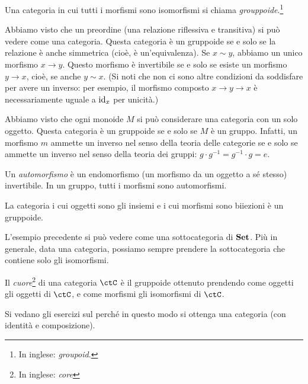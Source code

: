\begin{definition}
 Una categoria in cui tutti i morfismi sono isomorfismi si chiama \emph{grouppoide}.\footnote{In inglese: \emph{groupoid}.} 
\end{definition}

\begin{example}
 Abbiamo visto che un preordine (una relazione riflessiva e transitiva) si può vedere come una categoria. Questa categoria è un gruppoide se e solo se la relazione è anche simmetrica (cioè, è un'equivalenza). Se $x\sim y$, abbiamo un unico morfismo $x\to y$. Questo morfismo è invertibile se e solo se esiste un morfismo $y\to x$, cioè, se anche $y\sim x$. (Si noti che non ci sono altre condizioni da soddisfare per avere un inverso: per esempio, il morfismo composto $x\to y\to x$ è necessariamente uguale a $\mathrm{id}_x$ per unicità.)
\end{example}

\begin{example}
 Abbiamo visto che ogni monoide $M$ si può considerare una categoria con un solo oggetto. Questa categoria è un gruppoide se e solo se $M$ è un gruppo. Infatti, un morfismo $m$ ammette un inverso nel senso della teoria delle categorie se e solo se ammette un inverso nel senso della teoria dei gruppi: $g\cdot g^{-1}=g^{-1}\cdot g = e$. 
\end{example}

Un \emph{automorfismo} è un endomorfismo (un morfismo da un oggetto a sé stesso) invertibile. In un gruppo, tutti i morfismi sono automorfismi.

\begin{example}
 La categoria i cui oggetti sono gli insiemi e i cui morfismi sono biiezioni è un gruppoide.
\end{example}

L'esempio precedente si può vedere come una sottocategoria di $\mathbf{Set}$.
Più in generale, data una categoria, possiamo sempre prendere la sottocategoria che contiene solo gli isomorfismi.

\begin{definition} 
 Il \emph{cuore}\footnote{In inglese: \emph{core}} di una categoria $\ctC$ è il gruppoide ottenuto prendendo come oggetti gli oggetti di $\ctC$, e come morfismi gli isomorfismi di $\ctC$. 
\end{definition}

Si vedano gli esercizi sul perché in questo modo si ottenga una categoria (con identità e composizione). 


